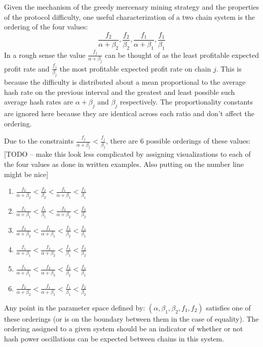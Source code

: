 \documentclass[10pt, preprint]{aastex}
\begin{document}
Given the mechanism of the greedy mercenary mining strategy and the properties of the protocol difficulty, one useful characterization of a two chain system is the ordering of the four values: 
$$
\frac{f_2}{\alpha + \beta_2}, \frac{f_2}{\beta_2}, \frac{f_1}{\alpha + \beta_1}, \frac{f_1}{\beta_1}
$$
In a rough sense the value $\frac{f_j}{\alpha + \beta_j}$ can be thought of as the least profitable expected profit rate and $\frac{f_j}{\beta_j}$ the most profitable expected profit rate on chain $j$.  This is because the difficulty is distributed about a mean proportional to the average hash rate on the previous interval and the greatest and least possible such average hash rates are $\alpha + \beta_j$ and $\beta_j$ respectively.  The proportionality constants are ignored here because they are identical across each ratio and don't affect the ordering.  

Due to the constraints $\frac{f_j}{\alpha + \beta_j} < \frac{f_j}{\beta_j}$, there are 6 possible orderings of these values: [TODO -- make this look less complicated by assigning visualizations to each of the four values as done in written examples.  Also putting on the number line might be nice]
\begin{enumerate}
\item
$\frac{f_2}{\alpha + \beta_2} < \frac{f_2}{\beta_2} < \frac{f_1}{\alpha + \beta_1} < \frac{f_1}{\beta_1}$
\item
$\frac{f_1}{\alpha + \beta_1} < \frac{f_1}{\beta_1} < \frac{f_2}{\alpha + \beta_2} < \frac{f_2}{\beta_2} $
\item
$\frac{f_2}{\alpha + \beta_2} < \frac{f_1}{\alpha + \beta_1} < \frac{f_2}{\beta_2} < \frac{f_1}{\beta_1}$
\item
$\frac{f_1}{\alpha + \beta_1} < \frac{f_2}{\alpha + \beta_2} < \frac{f_1}{\beta_1} < \frac{f_2}{\beta_2}$
\item
$\frac{f_1}{\alpha + \beta_1} <  \frac{f_2}{\alpha + \beta_2} < \frac{f_2}{\beta_2} <  \frac{f_1}{\beta_1} $
\item
$ \frac{f_2}{\alpha + \beta_2} <  \frac{f_1}{\alpha + \beta_1} < \frac{f_1}{\beta_1}  < \frac{f_2}{\beta_2} $
\end{enumerate}

Any point in the parameter space defined by: $(\alpha, \beta_1, \beta_2, f_1, f_2)$ satisfies one of these orderings (or is on the boundary between them in the case of equality).  The ordering assigned to a given system should be an indicator of whether or not hash power oscillations can be expected between chains in this system.  
\end{document}
